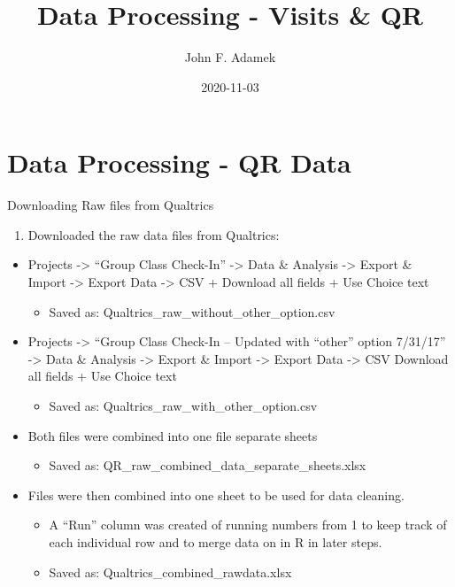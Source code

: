 \documentclass[
]{book}
\title{Data Processing - Visits \& QR}
\author{John F. Adamek}
\date{2020-11-03}
\providecommand{\tightlist}{%
  \setlength{\itemsep}{0pt}\setlength{\parskip}{0pt}}
\begin{document}
\maketitle

{
\setcounter{tocdepth}{1}
\tableofcontents
}
\hypertarget{data-processing---qr-data}{%
\chapter{Data Processing - QR Data}\label{data-processing---qr-data}}

Downloading Raw files from Qualtrics

\begin{enumerate}
\def\labelenumi{\arabic{enumi}.}
\tightlist
\item
  Downloaded the raw data files from Qualtrics:
\end{enumerate}

\begin{itemize}
\tightlist
\item
  Projects -\textgreater{} ``Group Class Check-In'' -\textgreater{} Data \& Analysis -\textgreater{} Export \& Import -\textgreater{} Export Data -\textgreater{} CSV + Download all fields + Use Choice text

  \begin{itemize}
  \tightlist
  \item
    Saved as: Qualtrics\_raw\_without\_other\_option.csv
  \end{itemize}
\item
  Projects -\textgreater{} ``Group Class Check-In -- Updated with ``other'' option 7/31/17'' -\textgreater{} Data \& Analysis -\textgreater{} Export \& Import -\textgreater{} Export Data -\textgreater{} CSV Download all fields + Use Choice text

  \begin{itemize}
  \tightlist
  \item
    Saved as: Qualtrics\_raw\_with\_other\_option.csv
  \end{itemize}
\item
  Both files were combined into one file separate sheets

  \begin{itemize}
  \tightlist
  \item
    Saved as: QR\_raw\_combined\_data\_separate\_sheets.xlsx
  \end{itemize}
\item
  Files were then combined into one sheet to be used for data cleaning.

  \begin{itemize}
  \tightlist
  \item
    A ``Run'' column was created of running numbers from 1 to keep track of each individual row and to merge data on in R in later steps.
  \item
    Saved as: Qualtrics\_combined\_rawdata.xlsx
  \end{itemize}
\end{itemize}
\end{document}

